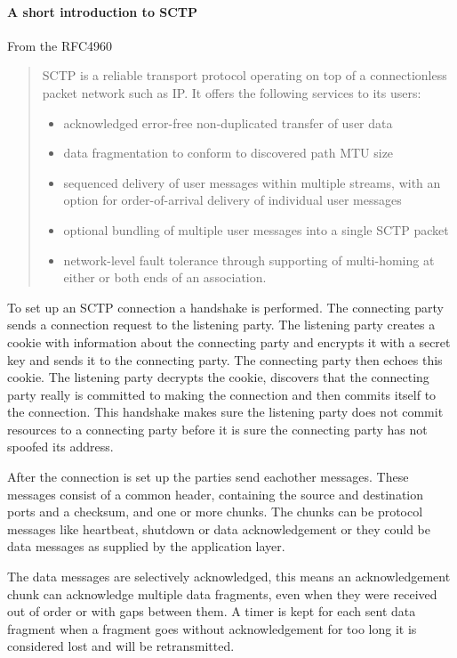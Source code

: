\paragraph{A short introduction to SCTP}
From the RFC4960\cite{_rfc_????}
\begin{quotation}
SCTP is a reliable transport protocol operating on top of a
   connectionless packet network such as IP.  It offers the following
   services to its users:
\begin{itemize}

   \item acknowledged error-free non-duplicated transfer of user data

   \item data fragmentation to conform to discovered path MTU size

   \item sequenced delivery of user messages within multiple streams, with
       an option for order-of-arrival delivery of individual user
       messages

   \item optional bundling of multiple user messages into a single SCTP
       packet

   \item network-level fault tolerance through supporting of multi-homing
       at either or both ends of an association.
\end{itemize}
\end{quotation}

To set up an SCTP connection a handshake is performed. The connecting party sends a connection request to the listening party. The listening party creates a cookie with information about the connecting party and encrypts it with a secret key and sends it to the connecting party. The connecting party then echoes this cookie. The listening party decrypts the cookie, discovers that the connecting party really is committed to making the connection and then commits itself to the connection. This handshake makes sure the listening party does not commit resources to a connecting party before it is sure the connecting party has not spoofed its address.

After the connection is set up the parties send eachother messages. These messages consist of a common header, containing the source and destination ports and a checksum, and one or more chunks. The chunks can be protocol messages like heartbeat, shutdown or data acknowledgement or they could be data messages as supplied by the application layer.

The data messages are selectively acknowledged, this means an acknowledgement chunk can acknowledge multiple data fragments, even when they were received out of order or with gaps between them. A timer is kept for each sent data fragment when a fragment goes without acknowledgement for too long it is considered lost and will be retransmitted. 
